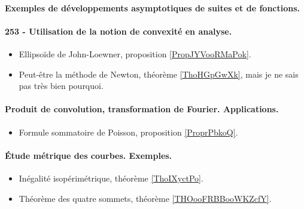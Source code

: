 \paragraph{Exemples de développements asymptotiques de suites et de fonctions.}
\paragraph{253 - Utilisation de la notion de convexité en analyse.}
\begin{itemize}
    \item Ellipsoïde de John-Loewner, proposition \ref{PropJYVooRMaPok}.
    \item Peut-être la méthode de Newton, théorème \ref{ThoHGpGwXk}, mais je ne sais pas très bien pourquoi.
\end{itemize}
\paragraph{Produit de convolution, transformation de Fourier. Applications.}
\begin{itemize}
    \item Formule sommatoire de Poisson, proposition \ref{ProprPbkoQ}.
\end{itemize}
\paragraph{Étude métrique des courbes. Exemples.}
\begin{itemize}
    \item Inégalité isopérimétrique, théorème \ref{ThoIXyctPo}.
    \item Théorème des quatre sommets, théorème \ref{THOooFRBBooWKZcfY}.
\end{itemize}
